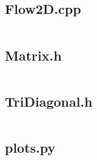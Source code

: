 \documentclass{article}
\begin{document}
\subsection*{Flow2D.cpp}
\inputminted[fontsize=\footnotesize]{c++}{../Flow2D.cpp}

\subsection*{Matrix.h}
\inputminted[fontsize=\footnotesize]{c++}{../Matrix.h}

\subsection*{TriDiagonal.h}
\inputminted[fontsize=\footnotesize]{c++}{../TriDiagonal.h}

\subsection*{plots.py}
\end{document}
